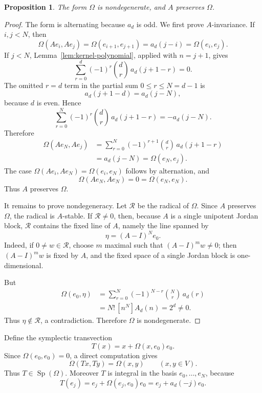 \documentclass[a4paper,11pt]{amsart}
\newtheorem{proposition}[theorem]{Proposition}
\theoremstyle{remark}
\DeclareMathOperator{\Sp}{Sp}
\numberwithin{equation}{section}
\begin{document}
\begin{proposition}\label{prop:symplectic-normal}
The form \(\Omega\) is nondegenerate, and \(A\) preserves \(\Omega\).
\end{proposition}

\begin{proof}
The form is alternating because \(a_d\) is odd.  We first prove \(A\)-invariance.  If \(i,j<N\), then
\[
        \Omega(Ae_i,Ae_j)
        =
        \Omega(e_{i+1},e_{j+1})
        =
        a_d(j-i)
        =
        \Omega(e_i,e_j).
\]
If \(j<N\), Lemma~\ref{lem:kernel-polynomial}, applied with \(n=j+1\), gives
\[
        \sum_{r=0}^{d}(-1)^r\binom dr\,a_d(j+1-r)=0.
\]
The omitted \(r=d\) term in the partial sum \(0\le r\le N=d-1\) is
\[
        a_d(j+1-d)=a_d(j-N),
\]
because \(d\) is even.  Hence
\[
        \sum_{r=0}^{N}(-1)^r\binom dr\,a_d(j+1-r)
        =
        -a_d(j-N).
\]
Therefore
\[
\begin{aligned}
        \Omega(Ae_N,Ae_j)
        &=
        \sum_{r=0}^{N}(-1)^{r+1}\binom dr\,a_d(j+1-r) \\
        &=
        a_d(j-N)
        =
        \Omega(e_N,e_j).
\end{aligned}
\]
The case \(\Omega(Ae_i,Ae_N)=\Omega(e_i,e_N)\) follows by alternation, and
\[
        \Omega(Ae_N,Ae_N)=0=\Omega(e_N,e_N).
\]
Thus \(A\) preserves \(\Omega\).

It remains to prove nondegeneracy.  Let \(\mathcal R\) be the radical of \(\Omega\).  Since \(A\) preserves \(\Omega\), the radical is \(A\)-stable.  If \(\mathcal R\ne0\), then, because \(A\) is a single unipotent Jordan block, \(\mathcal R\) contains the fixed line of \(A\), namely the line spanned by
\[
        \eta=(A-I)^Ne_0.
\]
Indeed, if \(0\ne w\in\mathcal R\), choose \(m\) maximal such that \((A-I)^mw\ne0\); then \((A-I)^mw\) is fixed by \(A\), and the fixed space of a single Jordan block is one-dimensional.

But
\[
\begin{aligned}
        \Omega(e_0,\eta)
        &=
        \sum_{r=0}^{N}(-1)^{N-r}\binom Nr\,a_d(r)        \\
        &=
        N!\,[n^N]A_d(n)
        =
        2^d\ne0.
\end{aligned}
\]
Thus \(\eta\notin\mathcal R\), a contradiction.  Therefore \(\Omega\) is nondegenerate.
\end{proof}

Define the symplectic transvection
\[
        T(x)=x+\Omega(x,e_0)e_0.
\]
Since \(\Omega(e_0,e_0)=0\), a direct computation gives
\[
        \Omega(Tx,Ty)=\Omega(x,y)
        \qquad(x,y\in V).
\]
Thus \(T\in\Sp(\Omega)\).  Moreover \(T\) is integral in the basis \(e_0,\ldots,e_N\), because
\[
        T(e_j)=e_j+\Omega(e_j,e_0)e_0
        =
        e_j+a_d(-j)e_0.
\]
\end{document}
